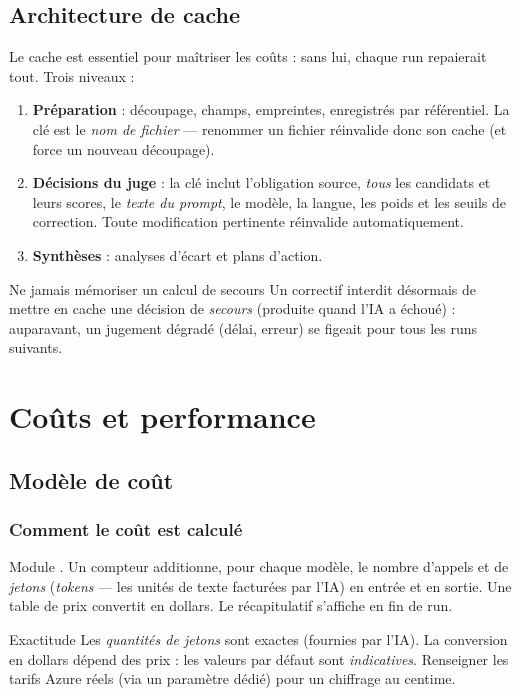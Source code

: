 \documentclass[11pt,a4paper]{report}
\newcommand{\code}[1]{\texttt{\detokenize{#1}}}
\begin{document}
\chapter{Architecture de cache}
Le cache est essentiel pour maîtriser les coûts : sans lui, chaque run repaierait tout. Trois niveaux :
\begin{enumerate}[nosep]
  \item \textbf{Préparation} : découpage, champs, empreintes, enregistrés par référentiel. La clé est le \emph{nom de fichier} --- renommer un fichier réinvalide donc son cache (et force un nouveau découpage).
  \item \textbf{Décisions du juge} : la clé inclut l'obligation source, \emph{tous} les candidats et leurs scores, le \emph{texte du prompt}, le modèle, la langue, les poids et les seuils de correction. Toute modification pertinente réinvalide automatiquement.
  \item \textbf{Synthèses} : analyses d'écart et plans d'action.
\end{enumerate}
\begin{keybox}{Ne jamais mémoriser un calcul de secours}
Un correctif interdit désormais de mettre en cache une décision de \emph{secours} (produite quand l'IA a échoué) : auparavant, un jugement dégradé (délai, erreur) se figeait pour tous les runs suivants.
\end{keybox}

\part{Coûts et performance}

\chapter{Modèle de coût}

\section{Comment le coût est calculé}
Module \code{cost.py}. Un compteur additionne, pour chaque modèle, le nombre d'appels et de \emph{jetons} (\emph{tokens} --- les unités de texte facturées par l'IA) en entrée et en sortie. Une table de prix convertit en dollars. Le récapitulatif s'affiche en fin de run.
\begin{keybox}{Exactitude}
Les \emph{quantités de jetons} sont exactes (fournies par l'IA). La conversion en dollars dépend des prix : les valeurs par défaut sont \emph{indicatives}. Renseigner les tarifs Azure réels (via un paramètre dédié) pour un chiffrage au centime.
\end{keybox}
\end{document}
